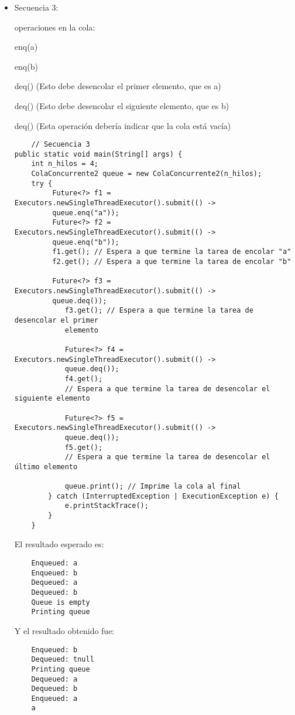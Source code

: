 \begin{enumerate}
\begin{itemize}
    \item Secuencia 3:

    operaciones en la cola:

    enq(a)

    enq(b)

    deq() (Esto debe desencolar el primer elemento, que es a)

    deq() (Esto debe desencolar el siguiente elemento, que es b)

    deq() (Esta operación debería indicar que la cola está vacía)

    \begin{verbatim}
    // Secuencia 3
public static void main(String[] args) {
    int n_hilos = 4;
    ColaConcurrente2 queue = new ColaConcurrente2(n_hilos);
    try {
         Future<?> f1 = Executors.newSingleThreadExecutor().submit(() -> 
         queue.enq("a"));
         Future<?> f2 = Executors.newSingleThreadExecutor().submit(() -> 
         queue.enq("b"));
         f1.get(); // Espera a que termine la tarea de encolar "a"
         f2.get(); // Espera a que termine la tarea de encolar "b"
            
         Future<?> f3 = Executors.newSingleThreadExecutor().submit(() -> 
         queue.deq());
            f3.get(); // Espera a que termine la tarea de desencolar el primer 
            elemento

            Future<?> f4 = Executors.newSingleThreadExecutor().submit(() -> 
            queue.deq());
            f4.get(); 
            // Espera a que termine la tarea de desencolar el siguiente elemento

            Future<?> f5 = Executors.newSingleThreadExecutor().submit(() -> 
            queue.deq());
            f5.get(); 
            // Espera a que termine la tarea de desencolar el último elemento

            queue.print(); // Imprime la cola al final
        } catch (InterruptedException | ExecutionException e) {
            e.printStackTrace();
        }
    }
    \end{verbatim}

    El resultado esperado es:
    \begin{verbatim}
    Enqueued: a
    Enqueued: b
    Dequeued: a
    Dequeued: b
    Queue is empty
    Printing queue
    \end{verbatim}

    Y el resultado obtenido fue:
    \begin{verbatim}
    Enqueued: b
    Dequeued: tnull
    Printing queue
    Dequeued: a
    Dequeued: b
    Enqueued: a
    a
    \end{verbatim}


\end{itemize}
\end{enumerate}
